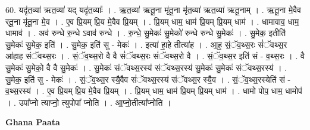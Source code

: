 \documentclass[17pt]{extarticle}
\begin{document}
60. यदृ॑त॒व्या॑ ऋत॒व्या॑ यद् यदृ॑त॒व्याः᳚ । . ऋ॒त॒व्या॑ ऋतू॒ना मृ॑तू॒ना मृ॑त॒व्या॑ ऋत॒व्या॑ ऋतू॒नाम् । . ऋ॒तू॒ना मे॒वैव र्‌तू॒ना मृ॑तू॒ना मे॒व । . ए॒व प्रि॒यम् प्रि॒य मे॒वैव प्रि॒यम् । . प्रि॒यम् धाम॒ धाम॑ प्रि॒यम् प्रि॒यम् धाम॑ । . धामावाव॒ धाम॒ धामाव॑ । . अव॑ रुन्धे रु॒न्धे ऽवाव॑ रुन्धे । . रु॒न्धे॒ सु॒मेकः॑ सु॒मेको॑ रुन्धे रुन्धे सु॒मेकः॑ । . सु॒मेक॒ इतीति॑ सु॒मेकः॑ सु॒मेक॒ इति॑ । . सु॒मेक॒ इति॑ सु - मेकः॑ । . इत्या॑ हा॒हे तीत्या॑ह । . आ॒ह॒ सं॒ॅव॒थ्स॒रः सं॑ॅवथ्स॒र आ॑हाह संॅवथ्स॒रः । . सं॒ॅव॒थ्स॒रो वै वै सं॑ॅवथ्स॒रः सं॑ॅवथ्स॒रो वै । . सं॒ॅव॒थ्स॒र इति॑ सं - व॒थ्स॒रः । . वै सु॒मेकः॑ सु॒मेको॒ वै वै सु॒मेकः॑ । . सु॒मेकः॑ संॅवथ्स॒रस्य॑ संॅवथ्स॒रस्य॑ सु॒मेकः॑ सु॒मेकः॑ संॅवथ्स॒रस्य॑ । . सु॒मेक॒ इति॑ सु - मेकः॑ । . सं॒ॅव॒थ्स॒र स्यै॒वैव सं॑ॅवथ्स॒रस्य॑ संॅवथ्स॒र स्यै॒व । . सं॒ॅव॒थ्स॒रस्येति॑ सं - व॒थ्स॒रस्य॑ । . ए॒व प्रि॒यम् प्रि॒य मे॒वैव प्रि॒यम् । . प्रि॒यम् धाम॒ धाम॑ प्रि॒यम् प्रि॒यम् धाम॑ । . धामो पोप॒ धाम॒ धामोप॑ । . उपा᳚प्नो त्याप्नो॒ त्युपोपा᳚ प्नोति । . आ॒प्नो॒तीत्या᳚प्नोति । \newline

\textbf{Ghana Paata } \newline
\end{document}
